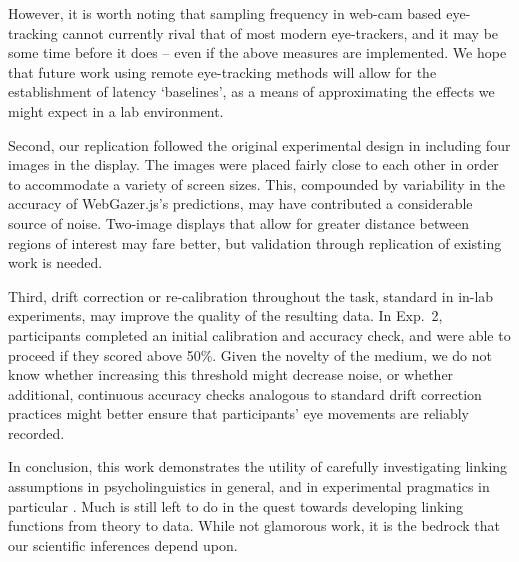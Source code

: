 \documentclass[10pt,letterpaper]{article}
\begin{document}
However, it is worth noting that sampling frequency in web-cam based eye-tracking cannot currently rival that of most modern eye-trackers, and it may be some time before it does -- even if the above measures are implemented. We hope that future work using remote eye-tracking methods will allow for the establishment of latency `baselines', as a means of approximating the effects we might expect in a lab environment. %



Second, our replication followed the original experimental design in including four images in the display. The images were placed fairly close to each other in order to accommodate a variety of screen sizes. This, compounded by variability in the accuracy of WebGazer.js's predictions, may have contributed a considerable source of noise. Two-image displays that allow for greater distance between regions of interest may fare better, but validation through replication of existing work is needed. 

Third, drift correction or re-calibration throughout the task, standard in in-lab experiments, may improve the quality of the resulting data. In Exp.~2, participants completed an initial calibration and accuracy check, and were able to proceed if they scored above 50\%. Given the novelty of the medium, we do not know whether increasing this threshold might decrease noise, or whether additional, continuous accuracy checks analogous to standard drift correction practices might better ensure that participants' eye movements are reliably recorded.


In conclusion, this work demonstrates the utility of carefully investigating linking assumptions in psycholinguistics in general, and in experimental pragmatics in particular \cite<see also>{franke2016link,WaldonDegen2020}. Much is still left to do in the quest towards developing linking functions from theory to data. While not glamorous work, it is the bedrock that our scientific inferences depend upon.
\end{document}
